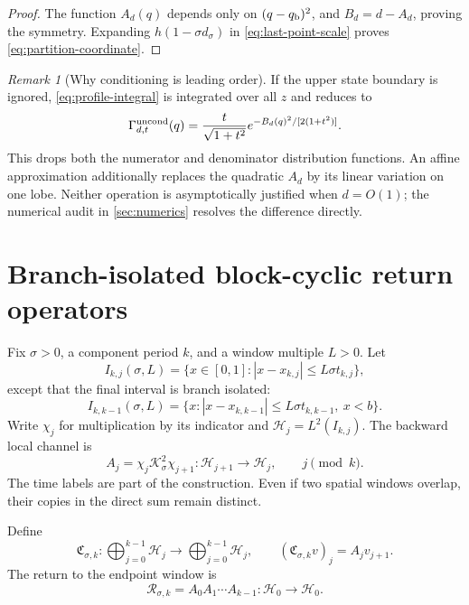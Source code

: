 \documentclass[11pt]{article}
\theoremstyle{definition}
\theoremstyle{remark}
\newtheorem{remark}[theorem]{Remark}
\newcommand{\cK}{\mathcal K}
\newcommand{\cR}{\mathcal R}
\newcommand{\cH}{\mathcal H}
\begin{document}
\begin{proof}
The function $A_d(q)$ depends only on
$(q-q_{\rm b})^2$, and $B_d=d-A_d$, proving the symmetry.  Expanding
$h(1-\sigma d_\sigma)$ in \eqref{eq:last-point-scale} proves
\eqref{eq:partition-coordinate}.
\end{proof}

\begin{remark}[Why conditioning is leading order]
\label{rem:conditioning-profile}
If the upper state boundary is ignored, \eqref{eq:profile-integral} is
integrated over all $z$ and reduces to
\begin{equation}\label{eq:unconditioned-profile}
 \Gamma_{d,t}^{\rm uncond}(q)
 =\frac{t}{\sqrt{1+t^2}}
 e^{-B_d(q)^2/[2(1+t^2)]}.
\end{equation}
This drops both the numerator and denominator distribution functions.  An
affine approximation additionally replaces the quadratic $A_d$ by its
linear variation on one lobe.  Neither operation is asymptotically justified
when $d=O(1)$; the numerical audit in \cref{sec:numerics} resolves the
difference directly.
\end{remark}

\section{Branch-isolated block-cyclic return operators}
\label{sec:block-cyclic}

Fix $\sigma>0$, a component period $k$, and a window multiple $L>0$.  Let
\begin{equation}\label{eq:packet-windows}
 I_{k,j}(\sigma,L)
 =\{x\in[0,1]:|x-x_{k,j}|\le L\sigma t_{k,j}\},
\end{equation}
except that the final interval is branch isolated:
\begin{equation}\label{eq:branch-window}
 I_{k,k-1}(\sigma,L)
 =\{x:|x-x_{k,k-1}|\le L\sigma t_{k,k-1},\ x<b\}.
\end{equation}
Write $\chi_j$ for multiplication by its indicator and
$\cH_j=L^2(I_{k,j})$.  The backward local channel is
\begin{equation}\label{eq:local-channel}
 A_j=\chi_j\cK_\sigma^2\chi_{j+1}:
 \cH_{j+1}\longrightarrow\cH_j,
 \qquad j\pmod k.
\end{equation}
The time labels are part of the construction.  Even if two spatial windows
overlap, their copies in the direct sum remain distinct.

Define
\begin{equation}\label{eq:block-cyclic-operator}
 \mathfrak C_{\sigma,k}:\bigoplus_{j=0}^{k-1}\cH_j
 \longrightarrow\bigoplus_{j=0}^{k-1}\cH_j,
 \qquad
 (\mathfrak C_{\sigma,k}v)_j=A_jv_{j+1}.
\end{equation}
The return to the endpoint window is
\begin{equation}\label{eq:return-operator}
 \cR_{\sigma,k}=A_0A_1\cdots A_{k-1}:\cH_0\to\cH_0.
\end{equation}
\end{document}
